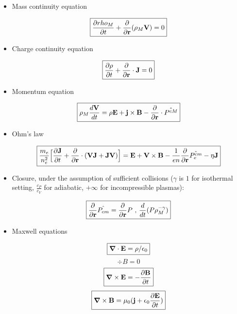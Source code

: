 \documentclass[PlasmaNotes.tex]{subfiles}
\begin{document}
\begin{itemize}
\item Mass continuity equation

\begin{equation}
\boxed{ \frac{\partial rho_M}{\partial t} + \frac{\partial }{\partial \mathbf{r}} (\rho_M \mathbf{V}) = 0 }
\end{equation}

\item Charge continuity equation

\begin{equation}
\boxed{ \frac{\partial \rho}{\partial t} + \frac{\partial }{\partial \mathbf{r}} \cdot \mathbf{J} = 0 }
\end{equation}

\item Momentum equation

\begin{equation}
\boxed{ \rho_M \frac{d \mathbf{V}}{d t} = \rho \mathbf{E} + \mathbf{j} \times \mathbf{B} - \frac{\partial }{\partial \mathbf{r}} \cdot \hat{P^{cM}} }
\end{equation}

\item Ohm's law

\begin{equation}
\boxed{ \frac{m_e}{n_e^2} \Big[ \frac{\partial \mathbf{J}}{\partial t} + \frac{\partial }{\partial \mathbf{r}} \cdot ( \mathbf{V} \mathbf{J} + \mathbf{J} \mathbf{V}) \Big] = \mathbf{E} + \mathbf{V} \times \mathbf{B} - \frac{1}{e n} \frac{\partial }{\partial \mathbf{r}} \hat{P_e^{cm}} - \eta \mathbf{J} }
\end{equation}

\item Closure, under the assumption of sufficient collisions ($\gamma$ is $1$ for isothermal setting, $\frac{c_P}{c_V}$ for adiabatic, $+\infty$ for incompressible plasmas):

\begin{equation}
\boxed{ \frac{\partial }{\partial \mathbf{r}} \hat{P_{cm}} = \frac{\partial }{\partial \mathbf{r}} P\text{ , } \frac{d }{d t} (P \rho_M^{-\gamma}) }
\end{equation}

\item Maxwell equations

\begin{equation}
\boxed{ \mbox{\boldmath$ \nabla $} \cdot \mathbf{E} = \rho/\epsilon_0 }
\end{equation}
\begin{equation}
\boxed{
\div{B} = 0 }
\end{equation}
\begin{equation}
\boxed{\mbox{\boldmath$ \nabla $} \times \mathbf{E} = -\frac{\partial \mathbf{B}}{\partial t} }
\end{equation}
\begin{equation}
\boxed{\mbox{\boldmath$ \nabla $} \times \mathbf{B} = \mu_0(\mathbf{j} + \epsilon_0 \frac{\partial \mathbf{E}}{\partial t}) }
\end{equation}

\end{itemize}
\end{document}
